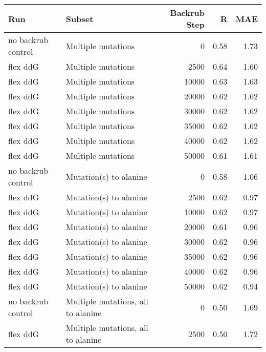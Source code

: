 \begin{table}
\begin{tabular}{llrrr}
\toprule
                Run &                               Subset &  Backrub Step &    R &  MAE \\
\midrule
 no backrub control &                   Multiple mutations &             0 & 0.58 & 1.73 \\
           flex ddG &                   Multiple mutations &          2500 & 0.64 & 1.60 \\
           flex ddG &                   Multiple mutations &         10000 & 0.63 & 1.63 \\
           flex ddG &                   Multiple mutations &         20000 & 0.62 & 1.62 \\
           flex ddG &                   Multiple mutations &         30000 & 0.62 & 1.62 \\
           flex ddG &                   Multiple mutations &         35000 & 0.62 & 1.62 \\
           flex ddG &                   Multiple mutations &         40000 & 0.62 & 1.62 \\
           flex ddG &                   Multiple mutations &         50000 & 0.61 & 1.61 \\
 no backrub control &               Mutation(s) to alanine &             0 & 0.58 & 1.06 \\
           flex ddG &               Mutation(s) to alanine &          2500 & 0.62 & 0.97 \\
           flex ddG &               Mutation(s) to alanine &         10000 & 0.62 & 0.97 \\
           flex ddG &               Mutation(s) to alanine &         20000 & 0.61 & 0.96 \\
           flex ddG &               Mutation(s) to alanine &         30000 & 0.62 & 0.96 \\
           flex ddG &               Mutation(s) to alanine &         35000 & 0.62 & 0.96 \\
           flex ddG &               Mutation(s) to alanine &         40000 & 0.62 & 0.96 \\
           flex ddG &               Mutation(s) to alanine &         50000 & 0.62 & 0.94 \\
 no backrub control &   Multiple mutations, all to alanine &             0 & 0.50 & 1.69 \\
           flex ddG &   Multiple mutations, all to alanine &          2500 & 0.50 & 1.72 \\

\end{tabular}
\end{table}
